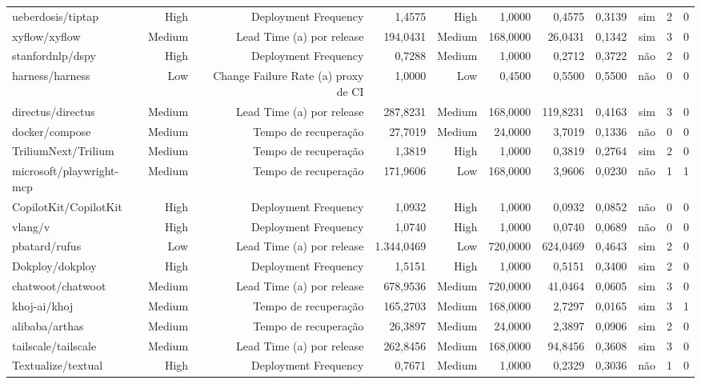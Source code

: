 \begin{tabular}{lrrrrrrrrrr}
ueberdosis/tiptap & High & Deployment Frequency & 1,4575 & High & 1,0000 & 0,4575 & 0,3139 & sim & 2 & 0 \\
xyflow/xyflow & Medium & Lead Time (a) por release & 194,0431 & Medium & 168,0000 & 26,0431 & 0,1342 & sim & 3 & 0 \\
stanfordnlp/dspy & High & Deployment Frequency & 0,7288 & Medium & 1,0000 & 0,2712 & 0,3722 & não & 2 & 0 \\
harness/harness & Low & Change Failure Rate (a) proxy de CI & 1,0000 & Low & 0,4500 & 0,5500 & 0,5500 & não & 0 & 0 \\
directus/directus & Medium & Lead Time (a) por release & 287,8231 & Medium & 168,0000 & 119,8231 & 0,4163 & sim & 3 & 0 \\
docker/compose & Medium & Tempo de recuperação & 27,7019 & Medium & 24,0000 & 3,7019 & 0,1336 & não & 0 & 0 \\
TriliumNext/Trilium & Medium & Tempo de recuperação & 1,3819 & High & 1,0000 & 0,3819 & 0,2764 & sim & 2 & 0 \\
microsoft/playwright-mcp & Medium & Tempo de recuperação & 171,9606 & Low & 168,0000 & 3,9606 & 0,0230 & não & 1 & 1 \\
CopilotKit/CopilotKit & High & Deployment Frequency & 1,0932 & High & 1,0000 & 0,0932 & 0,0852 & não & 0 & 0 \\
vlang/v & High & Deployment Frequency & 1,0740 & High & 1,0000 & 0,0740 & 0,0689 & não & 0 & 0 \\
pbatard/rufus & Low & Lead Time (a) por release & 1.344,0469 & Low & 720,0000 & 624,0469 & 0,4643 & sim & 2 & 0 \\
Dokploy/dokploy & High & Deployment Frequency & 1,5151 & High & 1,0000 & 0,5151 & 0,3400 & sim & 2 & 0 \\
chatwoot/chatwoot & Medium & Lead Time (a) por release & 678,9536 & Medium & 720,0000 & 41,0464 & 0,0605 & sim & 3 & 0 \\
khoj-ai/khoj & Medium & Tempo de recuperação & 165,2703 & Medium & 168,0000 & 2,7297 & 0,0165 & sim & 3 & 1 \\
alibaba/arthas & Medium & Tempo de recuperação & 26,3897 & Medium & 24,0000 & 2,3897 & 0,0906 & sim & 2 & 0 \\
tailscale/tailscale & Medium & Lead Time (a) por release & 262,8456 & Medium & 168,0000 & 94,8456 & 0,3608 & sim & 3 & 0 \\
Textualize/textual & High & Deployment Frequency & 0,7671 & Medium & 1,0000 & 0,2329 & 0,3036 & não & 1 & 0 \\

\end{tabular}
